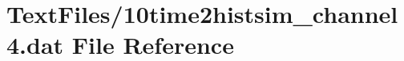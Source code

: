 \hypertarget{10time2histsim__channel4_8dat}{}\section{Text\+Files/10time2histsim\+\_\+channel4.dat File Reference}
\label{10time2histsim__channel4_8dat}
